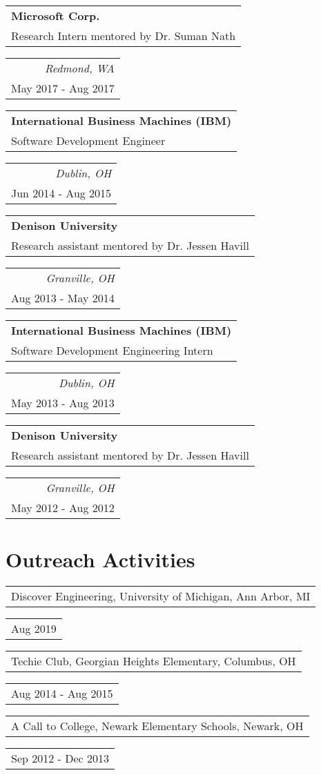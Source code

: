 \documentclass[letterpaper,10pt]{article}
\newcommand{\reitem}[2]{
  \begin{tabular}{l}
    #2
  \end{tabular}
\hfill
\begin{tabular}{r}
  #1
\end{tabular}
}
\newcommand{\quadItem}[4]{\reitem{\emph{#1}\\#2}{\textbf{#3}\\#4}}
\begin{document}
\quadItem{Redmond, WA}{May 2017 - Aug 2017}{Microsoft Corp.}{Research Intern mentored by Dr. Suman Nath}

\quadItem{Dublin, OH}{Jun 2014 - Aug 2015}{International Business Machines (IBM)} {Software Development Engineer}

\quadItem{Granville, OH}{Aug 2013 - May 2014}{Denison University} {Research assistant mentored by Dr. Jessen Havill}

\quadItem{Dublin, OH}{May 2013 - Aug 2013}{International Business Machines (IBM)} {Software Development Engineering Intern}

\quadItem{Granville, OH}{May 2012 - Aug 2012}{Denison University} {Research assistant mentored by Dr. Jessen Havill}

\section{Outreach Activities}
\reitem{Aug 2019}{Discover Engineering, University of Michigan, Ann Arbor, MI}

\reitem{Aug 2014 - Aug 2015}{Techie Club, Georgian Heights Elementary, Columbus, OH}

\reitem{Sep 2012 - Dec 2013}{A Call to College, Newark Elementary Schools, Newark, OH}
\end{document}
